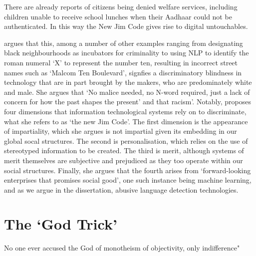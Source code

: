 \begin{aquote}{\citet[p. 133]{Benjamin:2019}}
  There are already reports of citizens being denied welfare services, including children unable to receive school lunches when their Aadhaar could not be authenticated. In this way the New Jim Code gives rise to digital untouchables.
\end{aquote}

\cite{Benjamin:2019} argues that this, among a number of other examples ranging from designating black neighbourhoods as incubators for criminality to using NLP to identify the roman numeral `X' to represent the number ten, resulting in incorrect street names such as `Malcom Ten Boulevard', signfies a discriminatory blindness in technology that are in part brought by the makers, who are predominately white and male. She argues that `No malice needed, no N-word required, just a lack of concern for how the past shapes the present' and that racism'. Notably, \cite{Benjamin:2019} proposes four dimensions that information technological systems rely on to discriminate, what she refers to as `the new Jim Code'. The first dimension is the appearance of impartiality, which she argues is not impartial given its embedding in our global socal structures. The second is personalisation, which relies on the use of stereotyped information to be created. The third is merit, although systems of merit themselves are subjective and prejudiced as they too operate within our social structures. Finally, she argues that the fourth arises from `forward-looking enterprises that promises social good', one such instance being machine learning, and as we argue in the dissertation, abusive language detection technologies.

\section{The `God Trick'}

\begin{aquote}{\citet{Haraway:1988}}
  No one ever accused the God of monotheism of objectivity, only indifference"
\end{aquote}

